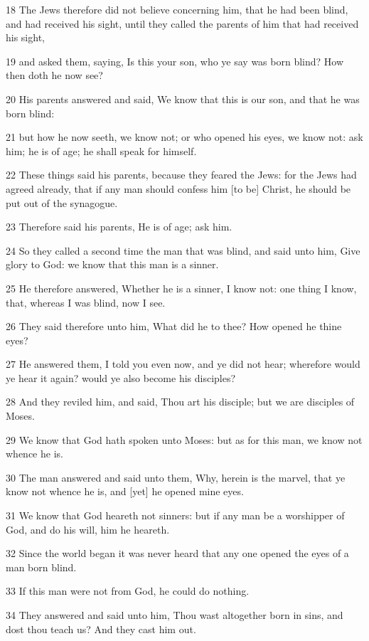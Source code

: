 \par 18 The Jews therefore did not believe concerning him, that he had been blind, and had received his sight, until they called the parents of him that had received his sight,
\par 19 and asked them, saying, Is this your son, who ye say was born blind? How then doth he now see?
\par 20 His parents answered and said, We know that this is our son, and that he was born blind:
\par 21 but how he now seeth, we know not; or who opened his eyes, we know not: ask him; he is of age; he shall speak for himself.
\par 22 These things said his parents, because they feared the Jews: for the Jews had agreed already, that if any man should confess him [to be] Christ, he should be put out of the synagogue.
\par 23 Therefore said his parents, He is of age; ask him.
\par 24 So they called a second time the man that was blind, and said unto him, Give glory to God: we know that this man is a sinner.
\par 25 He therefore answered, Whether he is a sinner, I know not: one thing I know, that, whereas I was blind, now I see.
\par 26 They said therefore unto him, What did he to thee? How opened he thine eyes?
\par 27 He answered them, I told you even now, and ye did not hear; wherefore would ye hear it again? would ye also become his disciples?
\par 28 And they reviled him, and said, Thou art his disciple; but we are disciples of Moses.
\par 29 We know that God hath spoken unto Moses: but as for this man, we know not whence he is.
\par 30 The man answered and said unto them, Why, herein is the marvel, that ye know not whence he is, and [yet] he opened mine eyes.
\par 31 We know that God heareth not sinners: but if any man be a worshipper of God, and do his will, him he heareth.
\par 32 Since the world began it was never heard that any one opened the eyes of a man born blind.
\par 33 If this man were not from God, he could do nothing.
\par 34 They answered and said unto him, Thou wast altogether born in sins, and dost thou teach us? And they cast him out.
